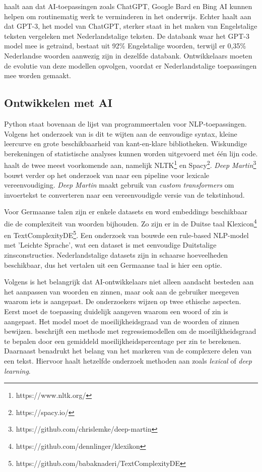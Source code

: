 \textcite{Verhoeven2023} haalt aan dat AI-toepassingen zoals ChatGPT, Google Bard en Bing AI kunnen helpen om routinematig werk te verminderen in het onderwijs. Echter haalt \textcite{Deckmyn2021} aan dat GPT-3, het model van ChatGPT, sterker staat in het maken van Engelstalige teksten vergeleken met Nederlandstalige teksten. De databank waar het GPT-3 model mee is getraind, bestaat uit 92\% Engelstalige woorden, terwijl er 0,35\% Nederlandse woorden aanwezig zijn in dezelfde databank. Ontwikkelaars moeten de evolutie van deze modellen opvolgen, voordat er Nederlandstalige toepassingen mee worden gemaakt.



\subsection{Ontwikkelen met AI}

Python staat bovenaan de lijst van programmeertalen voor NLP-toepassingen. Volgens het onderzoek van \textcite{Thangarajah2019} is dit te wijten aan de eenvoudige syntax, kleine leercurve en grote beschikbaarheid van kant-en-klare bibliotheken. Wiskundige berekeningen of statistische analyses kunnen worden uitgevoerd met één lijn code. \textcite{Malik2022} haalt de twee meest voorkomende aan, namelijk NLTK\footnote{https://www.nltk.org/} en Spacy\footnote{https://spacy.io/}. \textit{Deep Martin}\footnote{https://github.com/chrislemke/deep-martin} bouwt verder op het onderzoek van \textcite{Shardlow2014} naar een pipeline voor lexicale vereenvoudiging. \textit{Deep Martin} maakt gebruik van \textit{custom transformers} om invoertekst te converteren naar een vereenvoudigde versie van de tekstinhoud.

Voor Germaanse talen zijn er enkele datasets en word embeddings beschikbaar die de complexiteit van woorden bijhouden. Zo zijn er in de Duitse taal Klexicon\footnote{https://github.com/dennlinger/klexikon} en TextComplexityDE\footnote{https://github.com/babaknaderi/TextComplexityDE}. Een onderzoek van \textcite{Suter2016} bouwde een rule-based NLP-model met 'Leichte Sprache', wat een dataset is met eenvoudige Duitstalige zinsconstructies. Nederlandstalige datasets zijn in schaarse hoeveelheden beschikbaar, dus het vertalen uit een Germaanse taal is hier een optie.

Volgens \textcite{Garbacea2021} is het belangrijk dat AI-ontwikkelaars niet alleen aandacht besteden aan het aanpassen van woorden en zinnen, maar ook aan de gebruiker meegeven waarom iets is aangepast. De onderzoekers wijzen op twee ethische aspecten. Eerst moet de toepassing duidelijk aangeven waarom een woord of zin is aangepast. Het model moet de moeilijkheidsgraad van de woorden of zinnen bewijzen. \textcite{Iavarone2021} beschrijft een methode met regressiemodellen om de moeilijkheidsgraad te bepalen door een gemiddeld moeilijkheidspercentage per zin te berekenen. Daarnaast benadrukt \textcite{Garbacea2021} het belang van het markeren van de complexere delen van een tekst. Hiervoor haalt hetzelfde onderzoek methoden aan zoals \textit{lexical} of \textit{deep learning}.

